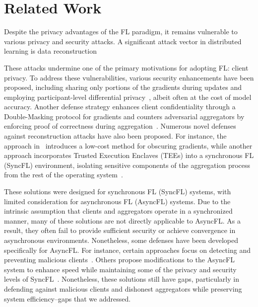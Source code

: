 \section{Related Work}
\label{sec02}
Despite the privacy advantages of the FL paradigm, it remains vulnerable to various privacy and security attacks\cite{nasshohou2019comprehensive,zhuLiGu2024evaluating,shostrmarc2017membership,melsondec2019exploiting,picromveg2023Perfectly,pasfraate2022Eluding}. A significant attack vector in distributed learning is data reconstruction~\cite{yanGeXia2023using, BoeDziSchu2023when,ZhaShaElk2024Large-scale}


These attacks undermine one of the primary motivations for adopting FL: client privacy. To address these vulnerabilities, various security enhancements have been proposed, including sharing only portions of the gradients during updates and employing participant-level differential privacy~\cite{ShoRezShm2015Privacy,weilima2023personalized,Hewancai2024clustered,HuGuoGon2023Federated,liuligao2023privacy-encoded}, albeit often at the cost of model accuracy. Another defense strategy enhances client confidentiality through a Double-Masking protocol for gradients and counters adversarial aggregators by enforcing proof of correctness during aggregation~\cite{xuliliu2020verifynet}.
Numerous novel defenses against reconstruction attacks have also been proposed. For instance, the approach in~\cite{NaHyeJun2022Closing} introduces a low-cost method for obscuring gradients, while another approach incorporates Trusted Execution Enclaves (TEEs) into a synchronous FL (SyncFL) environment, isolating sensitive components of the aggregation process from the rest of the operating system~\cite{Caozhazha2024SRFL}.


These solutions were designed for synchronous FL (SyncFL) systems, with limited consideration for asynchronous FL (AsyncFL) systems. Due to the intrinsic assumption that clients and aggregators operate in a synchronized manner, many of these solutions are not directly applicable to AsyncFL. As a result, they often fail to provide sufficient security or achieve convergence in asynchronous environments.
Nonetheless, some defenses have been developed specifically for AsyncFL. For instance, certain approaches focus on detecting and preventing malicious clients~\cite{FanLiuGon2022AFLGuard,tiacheyu2021towards,liuyuzon2024Delay}. Others propose modifications to the AsyncFL system to enhance speed while maintaining some of the privacy and security levels of SyncFL~\cite{ngumalzha2022federated}. Nonetheless, these solutions still have gaps, particularly in defending against malicious clients and dishonest aggregators while preserving system efficiency--gaps that we addressed.







  

